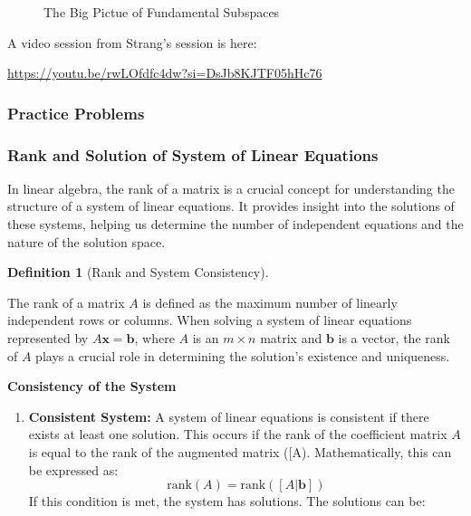 \documentclass[
  letterpaper,
  DIV=11,
  numbers=noendperiod]{scrreprt}
\theoremstyle{plain}
\theoremstyle{definition}
\newtheorem{definition}{Definition}[chapter]
\theoremstyle{remark}
\begin{document}
\begin{tcolorbox}
\begin{figure}[H]

\caption{\label{fig-big-pic}The Big Pictue of Fundamental Subspaces}

\end{figure}%

A video session from Strang's session is here:

\url{https://youtu.be/rwLOfdfc4dw?si=DsJb8KJTF05hHc76}

\subsubsection{Practice Problems}\label{practice-problems-2}

\subsubsection{Rank and Solution of System of Linear
Equations}\label{rank-and-solution-of-system-of-linear-equations}

In linear algebra, the rank of a matrix is a crucial concept for
understanding the structure of a system of linear equations. It provides
insight into the solutions of these systems, helping us determine the
number of independent equations and the nature of the solution space.

\begin{definition}[Rank and System
Consistency]\protect\hypertarget{def-soln}{}\label{def-soln}

The rank of a matrix \(A\) is defined as the maximum number of linearly
independent rows or columns. When solving a system of linear equations
represented by \(A\mathbf{x} = \mathbf{b}\), where \(A\) is an
\(m \times n\) matrix and \(\mathbf{b}\) is a vector, the rank of \(A\)
plays a crucial role in determining the solution's existence and
uniqueness.

\textbf{Consistency of the System}

\begin{enumerate}
\def\labelenumi{\arabic{enumi}.}
\item
  \textbf{Consistent System:} A system of linear equations is consistent
  if there exists at least one solution. This occurs if the rank of the
  coefficient matrix \(A\) is equal to the rank of the augmented matrix
  ({[}A\textbar{}\mathbf{b}{]}). Mathematically, this can be expressed
  as: \[\text{rank}(A) = \text{rank}([A|\mathbf{b}])\] If this condition
  is met, the system has solutions. The solutions can be:


\end{enumerate}
\end{definition}
\end{tcolorbox}
\end{document}
